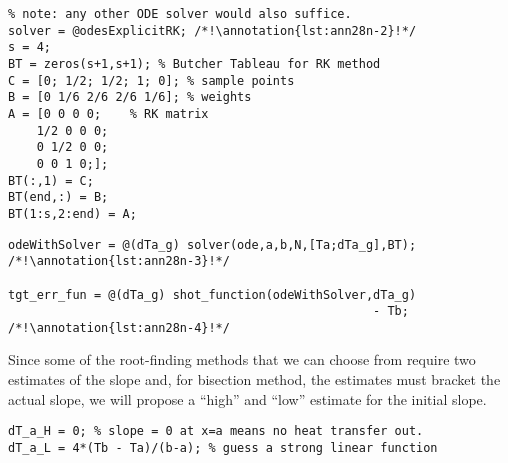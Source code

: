 \begin{lstlisting}[style=myMatlab,name=lec28n-ex1]
%% set RK4 solver tableau parameters
% note: any other ODE solver would also suffice.
solver = @odesExplicitRK; /*!\annotation{lst:ann28n-2}!*/
s = 4;
BT = zeros(s+1,s+1); % Butcher Tableau for RK method
C = [0; 1/2; 1/2; 1; 0]; % sample points
B = [0 1/6 2/6 2/6 1/6]; % weights
A = [0 0 0 0;    % RK matrix
    1/2 0 0 0;
    0 1/2 0 0;
    0 0 1 0;];
BT(:,1) = C;
BT(end,:) = B;
BT(1:s,2:end) = A;
\end{lstlisting}

\begin{lstlisting}[style=myMatlab,name=lec28n-ex1]
%% Commence Shooting Method
odeWithSolver = @(dTa_g) solver(ode,a,b,N,[Ta;dTa_g],BT); /*!\annotation{lst:ann28n-3}!*/

tgt_err_fun = @(dTa_g) shot_function(odeWithSolver,dTa_g) 
                                                   - Tb; /*!\annotation{lst:ann28n-4}!*/
\end{lstlisting}

Since some of the root-finding methods that we can choose from require two estimates of the slope and, for bisection method, the estimates must bracket the actual slope, we will propose a ``high'' and ``low'' estimate for the initial slope.
\begin{lstlisting}[style=myMatlab,name=lec28n-ex1]
% need two guesses at the slope
dT_a_H = 0; % slope = 0 at x=a means no heat transfer out.
dT_a_L = 4*(Tb - Ta)/(b-a); % guess a strong linear function
\end{lstlisting}

